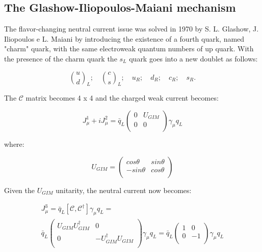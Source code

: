 \subsection{The Glashow-Iliopoulos-Maiani mechanism}

The flavor-changing neutral current issue was solved in 1970 by S. L. Glashow, J. Iliopoulos e L. Maiani \cite{Glashow:1970gm} by introducing the existence of a fourth quark, named "charm" quark, with the same electroweak quantum numbers of up quark. With the presence of the charm quark the $s_{L}$ quark goes into a new doublet as follows: 

\begin{equation}
\binom{u}{d}_{L}; \quad \binom{c}{s}_{L}; \quad u_{R}; \quad d_{R}; \quad c_{R}; \quad s_{R}.
\end{equation}

The $\mathcal{C}$ matrix becomes 4 x 4 and the charged weak current becomes:

\begin{equation}
J^{1}_{\mu} + i J^{2}_{\mu} = \bar{q}_{L} 
\begin{pmatrix}
0 &U_{GIM} \\
0 &0 \\
\end{pmatrix}
\gamma_{\mu}q_{L}
\label{eq::cab_current_gim}
\end{equation}

where:

\begin{equation}
U_{GIM} =
\begin{pmatrix}
cos\theta &sin\theta \\
-sin\theta &cos\theta \\
\end{pmatrix}
\end{equation}

Given the $U_{GIM}$ unitarity, the neutral current now becomes:

\begin{equation}
	\begin{aligned}
		J^{3}_{\mu} = \bar{q}_{L}\left[\mathcal{C}, \mathcal{C}^{\dagger} \right]\gamma_{\mu}q_{L} = \\
		\bar{q}_{L}
		\begin{pmatrix}
			U_{GIM}U_{GIM}^{\dagger} &0 \\
			0 &-U_{GIM}^{\dagger}U_{GIM} \\
		\end{pmatrix}
		\gamma_{\mu}q_{L} = \bar{q}_{L}
		\begin{pmatrix}
			1 &0 \\
			0 &-1 \\
		\end{pmatrix}
		\gamma_{\mu}q_{L}
	\end{aligned}
\end{equation}

